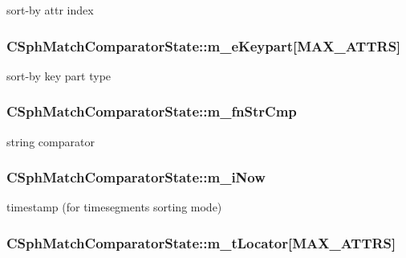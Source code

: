 sort-\/by attr index 

\hypertarget{structCSphMatchComparatorState_a0e0ab7b86cc6dcf782f0c44dba949495}{
\subsubsection[{m\-\_\-e\-Keypart}]{ C\-Sph\-Match\-Comparator\-State\-::m\-\_\-e\-Keypart\mbox{[}{\bf M\-A\-X\-\_\-\-A\-T\-T\-R\-S}\mbox{]}}}\label{structCSphMatchComparatorState_a0e0ab7b86cc6dcf782f0c44dba949495}


sort-\/by key part type 

\hypertarget{structCSphMatchComparatorState_a3b25365c56f4cba770d2e70be01a2a03}{
\subsubsection[{m\-\_\-fn\-Str\-Cmp}]{ C\-Sph\-Match\-Comparator\-State\-::m\-\_\-fn\-Str\-Cmp}}\label{structCSphMatchComparatorState_a3b25365c56f4cba770d2e70be01a2a03}


string comparator 

\hypertarget{structCSphMatchComparatorState_af698740294b9f825f6042c0feca4b54a}{
\subsubsection[{m\-\_\-i\-Now}]{ C\-Sph\-Match\-Comparator\-State\-::m\-\_\-i\-Now}}\label{structCSphMatchComparatorState_af698740294b9f825f6042c0feca4b54a}


timestamp (for timesegments sorting mode) 

\hypertarget{structCSphMatchComparatorState_a08841e269f9cfc9e6d8aa698dc8ad9fc}{
\subsubsection[{m\-\_\-t\-Locator}]{ C\-Sph\-Match\-Comparator\-State\-::m\-\_\-t\-Locator\mbox{[}{\bf M\-A\-X\-\_\-\-A\-T\-T\-R\-S}\mbox{]}}}\label{structCSphMatchComparatorState_a08841e269f9cfc9e6d8aa698dc8ad9fc}


